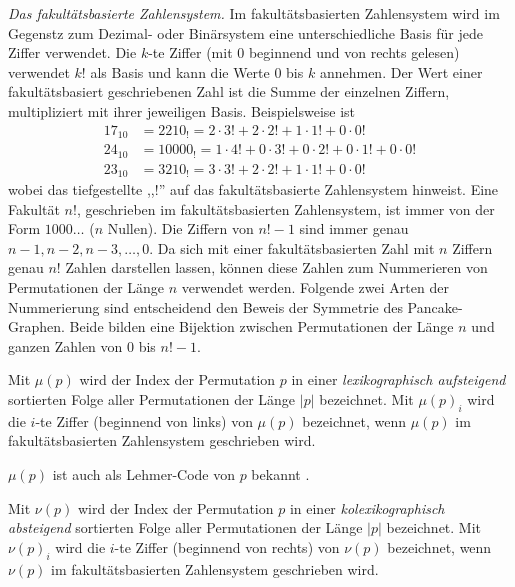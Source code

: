 \documentclass[a4paper, 10pt, ngerman]{article}
\begin{document}
\emph{Das fakultätsbasierte Zahlensystem.} Im fakultätsbasierten Zahlensystem wird im Gegenstz zum Dezimal- oder Binärsystem eine unterschiedliche Basis für jede Ziffer verwendet. Die $k$-te Ziffer (mit 0 beginnend und von rechts gelesen) verwendet $k!$ als Basis und kann die Werte 0 bis $k$ annehmen. Der Wert einer fakultätsbasiert geschriebenen Zahl ist die Summe der einzelnen Ziffern, multipliziert mit ihrer jeweiligen Basis. Beispielsweise ist
\begin{align*}
    17_{10} & = 2210_!   = 2 \cdot 3! + 2 \cdot 2! + 1 \cdot 1! + 0 \cdot 0!             \\
    24_{10} & = 10000_! = 1 \cdot 4! + 0 \cdot 3! + 0 \cdot 2! + 0 \cdot 1! + 0 \cdot 0! \\
    23_{10} & = 3210_!  = 3 \cdot 3! + 2 \cdot 2! + 1 \cdot 1! + 0 \cdot 0!
\end{align*}
wobei das tiefgestellte ,,!'' auf das fakultätsbasierte Zahlensystem hinweist. Eine Fakultät $n!$, geschrieben im fakultätsbasierten Zahlensystem, ist immer von der Form $1000\dots$ ($n$ Nullen). Die Ziffern von $n! - 1$ sind immer genau $n-1, n-2, n-3, \dots, 0$.
Da sich mit einer fakultätsbasierten Zahl mit $n$ Ziffern genau $n!$ Zahlen darstellen lassen, können diese Zahlen zum Nummerieren von Permutationen der Länge $n$ verwendet werden. Folgende zwei Arten der Nummerierung sind entscheidend den Beweis der Symmetrie des Pancake-Graphen. Beide bilden eine Bijektion zwischen Permutationen der Länge $n$ und ganzen Zahlen von 0 bis $n! - 1$.

\begin{definition}
    Mit $\mu(p)$ wird der Index der Permutation $p$ in einer \emph{lexikographisch aufsteigend} sortierten Folge aller Permutationen der Länge $|p|$ bezeichnet. Mit $\mu(p)_i$ wird die $i$-te Ziffer (beginnend von links) von $\mu(p)$ bezeichnet, wenn $\mu(p)$ im fakultätsbasierten Zahlensystem geschrieben wird.
\end{definition}

$\mu(p)$ ist auch als Lehmer-Code von $p$ bekannt \cite{factorial}.

\begin{definition}
    Mit $\nu(p)$ wird der Index der Permutation $p$ in einer \emph{kolexikographisch absteigend} sortierten Folge aller Permutationen der Länge $|p|$ bezeichnet. Mit $\nu(p)_i$ wird die $i$-te Ziffer (beginnend von rechts) von $\nu(p)$ bezeichnet, wenn $\nu(p)$ im fakultätsbasierten Zahlensystem geschrieben wird.
\end{definition}
\end{document}
